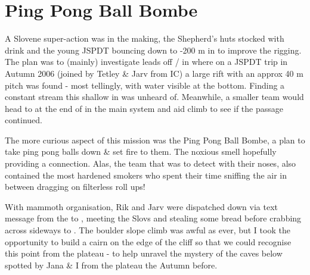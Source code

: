 \section{Ping Pong Ball Bombe}



A Slovene super-action was in the making, the Shepherd's huts stocked
with drink and the young JSPDT bouncing down to -200 m in
 to improve the rigging. The plan was to (mainly)
investigate leads off / in  where on a JSPDT
trip in Autumn 2006 (joined by Tetley \& Jarv from IC) a large rift with
an approx 40 m pitch was found - most tellingly, with water visible at
the bottom. Finding a constant stream this shallow in  was unheard
of. Meanwhile, a smaller team would head to  at the
end of  in the main system and aid climb to see if the
passage continued.

The more curious aspect of this mission was the Ping Pong Ball Bombe, a
plan to take ping pong balls down  \& set fire to
them. The noxious smell hopefully providing a connection. Alas, the
 team that was to detect with their noses, also contained the most
hardened smokers who spent their time sniffing the air in between
dragging on filterless roll ups!

With mammoth organisation, Rik and Jarv were dispatched down via text
message from the  to , meeting the Slovs and stealing some bread
before crabbing across sideways to . The boulder slope
climb was awful as ever, but I took the opportunity to build a cairn on
the edge of the cliff so that we could recognise this point from the
plateau - to help unravel the mystery of the caves below  spotted by
Jana \& I from the plateau the Autumn before.

